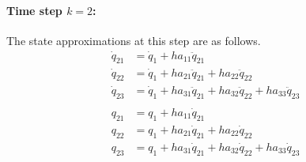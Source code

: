 \documentclass[10pt,letter]{book}
\begin{document}
     \paragraph{Time step $k=2$:}
     The state approximations at this step are as follows.
     \begin{equation}\nonumber
       \begin{split}
         \dot{q}_{21} &= \dot{q}_1 + h a_{11} \ddot{q}_{21} \\
         \dot{q}_{22} &= \dot{q}_1 + h a_{21} \ddot{q}_{21} + h a_{22} \ddot{q}_{22} \\
         \dot{q}_{23} &= \dot{q}_1 + h a_{31} \ddot{q}_{21} + h a_{32} \ddot{q}_{22} + h a_{33} \ddot{q}_{23} \\
         \\
         q_{21} &= q_1 + h a_{11} \dot{q}_{21} \\
         q_{22} &= q_1 + h a_{21} \dot{q}_{21} + h a_{22} \dot{q}_{22} \\
         q_{23} &= q_1 + h a_{31} \dot{q}_{21} + h a_{32} \dot{q}_{22} + h a_{33} \dot{q}_{23}
       \end{split}
     \end{equation}
\end{document}

